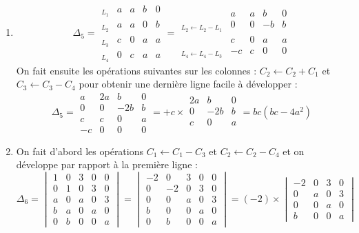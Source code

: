 {{\begin{enumerate}
  \item 
$$\Delta_5 =\begin{array}{l|cccc|} 
_{L_1} &a&a&b&0 \\ _{L_2} & a&a&0&b \\ _{L_3} & c&0&a&a \\ _{L_4} &0&c&a&a
\end{array}
= \begin{array}{l|cccc|} 
 &a&a&b&0 \\ _{L_2\leftarrow L_2-L_1} & 0&0&-b&b \\  & c&0&a&a \\ _{L_4\leftarrow L_4-L_3} & -c&c&0&0
\end{array}
$$
On fait ensuite les opérations suivantes sur les colonnes :
$C_2 \leftarrow C_2+C_1$ et $C_3 \leftarrow C_3-C_4$ pour obtenir 
une dernière ligne facile à développer :
$$\Delta_5 
= \begin{array}{|cccc|} 
 a&2a&b&0 \\ 0&0&-2b&b \\  c&c&0&a \\ -c&0&0&0
\end{array}
= +c \times \begin{array}{|ccc|} 
 2a&b&0 \\ 0&-2b&b \\  c&0&a \\
 \end{array} = bc(bc-4a^2)
$$
  \item
On fait d'abord les opérations $C_1 \leftarrow C_1-C_3$ et $C_2 \leftarrow C_2-C_4$
et on développe par rapport à la première ligne :
$$\Delta_6 = \begin{vmatrix}
1&0&3&0&0 \\ 0&1&0&3&0 \\ a&0&a&0&3 \\ b&a&0&a&0 \\ 0&b&0&0&a  
\end{vmatrix}
=
\begin{vmatrix}
-2&0&3&0&0 \\ 0&-2&0&3&0 \\ 0&0&a&0&3 \\ b&0&0&a&0 \\ 0&b&0&0&a  
\end{vmatrix}
= (-2) \times \begin{vmatrix}
-2&0&3&0 \\ 0&a&0&3 \\ 0&0&a&0 \\ b&0&0&a  
\end{vmatrix}
$$
\end{enumerate}}}
